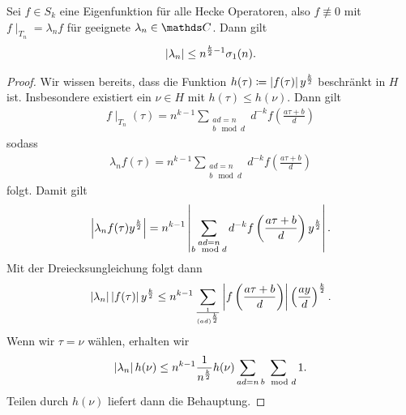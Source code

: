 \begin{prop}
Sei $f\in S_k$ eine Eigenfunktion für alle Hecke Operatoren, also $f\not \equiv 0$ mit $f\mid_{T_n}=\lambda_n f$ für geeignete $\lambda_n \in \C$.
Dann gilt
\begin{align*}
\left\vert\lambda_n\right\vert\leq n^{\frac{k}{2}-1}\sigma_1(n).
\end{align*}
\end{prop}
\begin{proof}
Wir wissen bereits, dass die Funktion $h(\tau)\coloneqq \left\vert f(\tau)\right\vert y^{\frac{k}{2}}$ beschränkt in $H$ ist.
Insbesondere existiert ein $\nu \in H$ mit $h(\tau)\leq h(\nu)$.
Dann gilt
\begin{align*}
f\mid_{T_n}(\tau)=n^{k-1} \sum_{\substack{ad=n \\ b \mod d}}d^{-k} f\left(\frac{a\tau+b}{d}\right)
\end{align*}
sodass
\begin{align*}
\lambda_n f(\tau)=n^{k-1} \sum_{\substack{ad=n \\ b \mod d}}d^{-k} f\left(\frac{a\tau+b}{d}\right)
\end{align*}
folgt.
Damit gilt
\begin{align*}
\left\vert\lambda_n f(\tau)y^{\frac{k}{2}}\right\vert =n^{k-1} \left\vert\sum_{\substack{ad=n \\ b \mod d}}d^{-k} f\left(\frac{a\tau+b}{d}\right) y^{\frac{k}{2}}\right\vert.
\end{align*}
Mit der Dreiecksungleichung folgt dann
\begin{align*}
\left\vert\lambda_n\right\vert \left\vert f(\tau)\right\vert y^{\frac{k}{2}} \leq n^{k-1} \sum_{\frac{1}{(ad)^{\frac{k}{2}}}} \left\vert f\left(\frac{a\tau+b}{d}\right)\right\vert \left(\frac{ay}{d}\right)^{\frac{k}{2}}.
\end{align*}
Wenn wir $\tau=\nu$ wählen, erhalten wir
\begin{align*}
\left\vert\lambda_n\right\vert h(\nu)\leq n^{k-1} \frac{1}{n^{\frac{k}{2}}} h(\nu) \sum_{ad=n} \sum_{b\mod d} 1.
\end{align*}
Teilen durch $h(\nu)$ liefert dann die Behauptung.
\end{proof}

